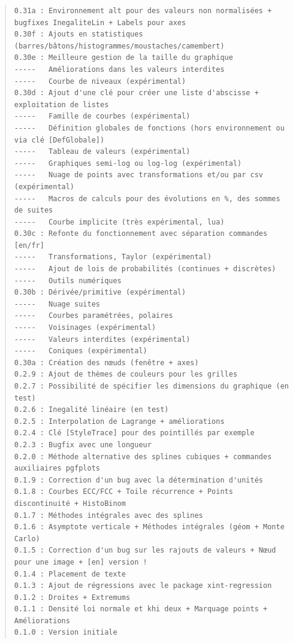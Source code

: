 \documentclass[11pt,a4paper]{ltxdoc}
\begin{document}
{\footnotesize \begin{quote}
\begin{verbatim}
0.31a : Environnement alt pour des valeurs non normalisées + bugfixes InegaliteLin + Labels pour axes
0.30f : Ajouts en statistiques (barres/bâtons/histogrammes/moustaches/camembert)
0.30e : Meilleure gestion de la taille du graphique
-----   Améliorations dans les valeurs interdites
-----   Courbe de niveaux (expérimental)
0.30d : Ajout d'une clé pour créer une liste d'abscisse + exploitation de listes
-----   Famille de courbes (expérimental)
-----   Définition globales de fonctions (hors environnement ou via clé [DefGlobale])
-----   Tableau de valeurs (expérimental)
-----   Graphiques semi-log ou log-log (expérimental)
-----   Nuage de points avec transformations et/ou par csv (expérimental)
-----   Macros de calculs pour des évolutions en %, des sommes de suites
-----   Courbe implicite (très expérimental, lua)
0.30c : Refonte du fonctionnement avec séparation commandes [en/fr]
-----   Transformations, Taylor (expérimental)
-----   Ajout de lois de probabilités (continues + discrètes)
-----   Outils numériques
0.30b : Dérivée/primitive (expérimental)
-----   Nuage suites
-----   Courbes paramétrées, polaires
-----   Voisinages (expérimental)
-----   Valeurs interdites (expérimental)
-----   Coniques (expérimental)
0.30a : Création des nœuds (fenêtre + axes)
0.2.9 : Ajout de thèmes de couleurs pour les grilles
0.2.7 : Possibilité de spécifier les dimensions du graphique (en test)
0.2.6 : Inegalité linéaire (en test)
0.2.5 : Interpolation de Lagrange + améliorations
0.2.4 : Clé [StyleTrace] pour des pointillés par exemple
0.2.3 : Bugfix avec une longueur
0.2.0 : Méthode alternative des splines cubiques + commandes auxiliaires pgfplots
0.1.9 : Correction d'un bug avec la détermination d'unités
0.1.8 : Courbes ECC/FCC + Toile récurrence + Points discontinuité + HistoBinom
0.1.7 : Méthodes intégrales avec des splines
0.1.6 : Asymptote verticale + Méthodes intégrales (géom + Monte Carlo)
0.1.5 : Correction d'un bug sur les rajouts de valeurs + Nœud pour une image + [en] version !
0.1.4 : Placement de texte
0.1.3 : Ajout de régressions avec le package xint-regression
0.1.2 : Droites + Extremums
0.1.1 : Densité loi normale et khi deux + Marquage points + Améliorations
0.1.0 : Version initiale
\end{verbatim}
\end{quote}}
\end{document}
